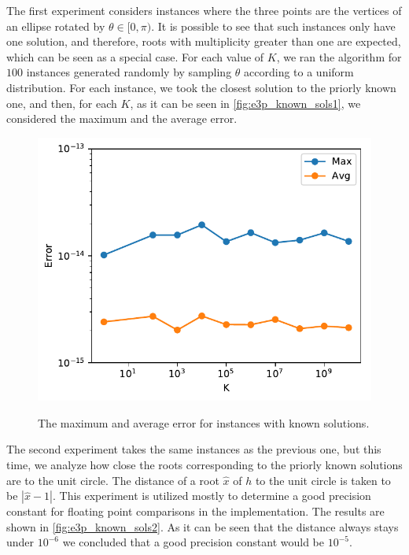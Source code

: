 The first experiment considers instances where the three points are the vertices of an ellipse rotated by $\theta\in[0, \pi)$. It is possible to see that such instances only have one solution, and therefore, roots with multiplicity greater than one are expected, which can be seen as a special case. 
For each value of $K$, we ran the algorithm for $100$ instances generated randomly by sampling $\theta$ according to a uniform distribution. For each instance, we took the closest solution to the priorly known one, and then, for each $K$, as it can be seen in \autoref{fig:e3p_known_sols1}, we considered the maximum and the average error.
\begin{figure}[H]
	\centering
	\caption{The maximum and average error for instances with known solutions.}
	\includegraphics[scale=.75]{tex/figures/e3p_known_sols1}
	\fautor
	\label{fig:e3p_known_sols1}
\end{figure}
The second experiment takes the same instances as the previous one, but this time, we analyze how close the roots corresponding to the priorly known solutions are to the unit circle. The distance of a root $\hat{x}$ of $h$ to the unit circle is taken to be $|\hat{x}-1|$. This experiment is utilized mostly to determine a good precision constant for floating point comparisons in the implementation. The results are shown in \autoref{fig:e3p_known_sols2}. As it can be seen that the distance always stays under $10^{-6}$ we concluded that a good precision constant would be $10^{-5}$.
